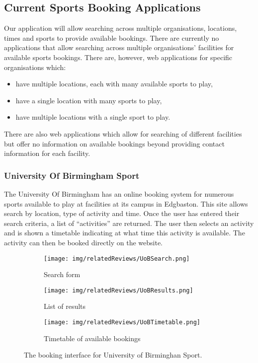 \subsection{Current Sports Booking Applications}
\label{sub:current_sports_booking_applications}

Our application will allow searching across multiple organisations, locations,
times and sports to provide available bookings. There are currently no
applications that allow searching across multiple organisations' facilities for
available sports bookings. There are, however, web applications for specific
organisations which:
\begin{itemize}
	\item have multiple locations, each with many available sports to play,
	\item have a single location with many sports to play,
	\item have multiple locations with a single sport to play.
\end{itemize}
There are also web applications which allow for searching of different
facilities but offer no information on available bookings beyond providing
contact information for each facility.

\subsubsection{University Of Birmingham Sport}
\label{ssub:university_of_birmingham_sport}

The University Of Birmingham has an online booking system for numerous sports
available to play at facilities at its campus in Edgbaston\cite{UOBSport}. This
site allows search by location, type of activity and time. Once the user has
entered their search criteria, a list of ``activities'' are returned. The user
then selects an activity and is shown a timetable indicating at what time this
activity is available. The activity can then be booked directly on the website.
\begin{figure}[htbp]
	\centering
	\begin{subfigure}[b]{0.4\textwidth}
		\texttt{[image: img/relatedReviews/UoBSearch.png]}
		\caption{Search form}\label{fig:UoBSearch}
	\end{subfigure}%
	\qquad
	\begin{subfigure}[b]{0.4\textwidth}
		\texttt{[image: img/relatedReviews/UoBResults.png]}
		\caption{List of results}\label{fig:UoBResults}
	\end{subfigure}
	\qquad
	\begin{subfigure}[b]{0.7\textwidth}
		\texttt{[image: img/relatedReviews/UoBTimetable.png]}
		\caption{Timetable of available bookings}\label{fig:UoBTimetable}
	\end{subfigure}
	\caption{The booking interface for University of Birminghan Sport.
	}\label{fig:animals}
\end{figure}

